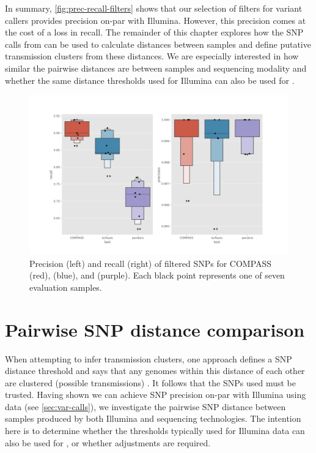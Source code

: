 In summary, \autoref{fig:prec-recall-filters} shows that our selection of filters for \ont{} variant callers provides precision on-par with Illumina. However, this precision comes at the cost of a loss in recall. The remainder of this chapter explores how the SNP calls from \ont{} can be used to calculate distances between samples and define putative transmission clusters from these distances. We are especially interested in how similar the pairwise distances are between samples and sequencing modality and whether the same distance thresholds used for Illumina can also be used for \ont{}.

\begin{figure}
\begin{center}
\includegraphics[width=0.9\columnwidth]{Chapter2/Figs/combined-precision-recall-filters-snps.png}
\caption{{Precision (left) and recall (right) of filtered SNPs for COMPASS (red), \bcftools{} (blue), and \pandora{} (purple). Each black point represents one of seven evaluation samples. 
{\label{fig:prec-recall-filters}}%
}}
\end{center}
\end{figure}


\section{Pairwise SNP distance comparison}
\label{sec:snp-dist}

When attempting to infer transmission clusters, one approach defines a SNP distance threshold and says that any genomes within this distance of each other are clustered (possible transmissions) \cite{walker2013}. It follows that the SNPs used must be trusted. Having shown we can achieve SNP precision on-par with Illumina using \ont{} data (see \autoref{sec:var-calls}), we investigate the pairwise SNP distance between samples produced by both Illumina and \ont{} sequencing technologies. The intention here is to determine whether the thresholds typically used for Illumina data can also be used for \ont{}, or whether adjustments are required.

